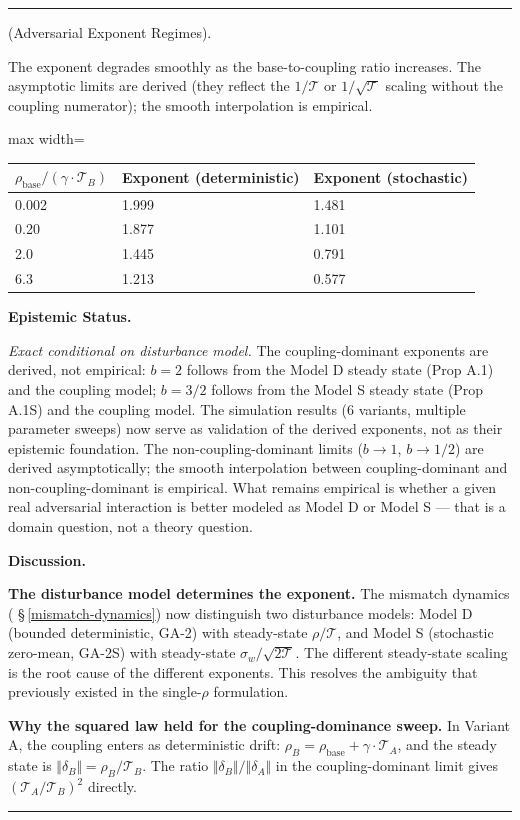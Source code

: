 \documentclass[11pt,oneside]{article}
\newcounter{claim}[section]
\renewcommand{\theclaim}{\thesection.\arabic{claim}}
\newenvironment{segment}[2]{%
  \refstepcounter{claim}%
  \bigskip\noindent\hrule\smallskip
  \noindent{\bfseries #1~\theclaim}\enskip(#2).\par\smallskip
  \noindent\ignorespaces
}{%
  \par\smallskip\noindent\hrule\bigskip
}
\newenvironment{observation}[1][]{\begin{segment}{Observation}{#1}}{\end{segment}}
\begin{document}
\begin{observation}[Adversarial Exponent Regimes]
The exponent degrades smoothly as the base-to-coupling ratio increases. The asymptotic limits are derived (they reflect the $1/\mathcal{T}$ or $1/\sqrt{\mathcal{T}}$ scaling without the coupling numerator); the smooth interpolation is empirical.

\begin{adjustbox}{max width=\textwidth}
\small
\begin{tabular}{lll}
\toprule
$\rho_{\text{base}} / (\gamma \cdot \mathcal T_B)$ & Exponent (deterministic) & Exponent (stochastic) \\
\midrule
0.002 & 1.999 & 1.481 \\
0.20 & 1.877 & 1.101 \\
2.0 & 1.445 & 0.791 \\
6.3 & 1.213 & 0.577 \\
\bottomrule
\end{tabular}
\end{adjustbox}



\medskip\noindent\textbf{Epistemic Status.}


\textit{Exact conditional on disturbance model.} The coupling-dominant exponents are derived, not empirical: $b = 2$ follows from the Model D steady state (Prop A.1) and the coupling model; $b = 3/2$ follows from the Model S steady state (Prop A.1S) and the coupling model. The simulation results (6 variants, multiple parameter sweeps) now serve as validation of the derived exponents, not as their epistemic foundation. The non-coupling-dominant limits ($b \to 1$, $b \to 1/2$) are derived asymptotically; the smooth interpolation between coupling-dominant and non-coupling-dominant is empirical. What remains empirical is whether a given real adversarial interaction is better modeled as Model D or Model S — that is a domain question, not a theory question.


\medskip\noindent\textbf{Discussion.}


\textbf{The disturbance model determines the exponent.} The mismatch dynamics ( \S\,\ref{mismatch-dynamics}) now distinguish two disturbance models: Model D (bounded deterministic, GA-2) with steady-state $\rho/\mathcal{T}$, and Model S (stochastic zero-mean, GA-2S) with steady-state $\sigma_w/\sqrt{2\mathcal{T}}$. The different steady-state scaling is the root cause of the different exponents. This resolves the ambiguity that previously existed in the single-$\rho$ formulation.

\textbf{Why the squared law held for the coupling-dominance sweep.} In Variant A, the coupling enters as deterministic drift: $\rho_B = \rho_{\text{base}} + \gamma \cdot \mathcal T_A$, and the steady state is $\Vert\delta_B\Vert = \rho_B / \mathcal T_B$. The ratio $\Vert\delta_B\Vert / \Vert\delta_A\Vert$ in the coupling-dominant limit gives $(\mathcal T_A / \mathcal T_B)^2$ directly.


\end{observation}
\end{document}
